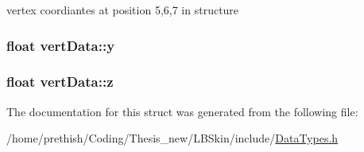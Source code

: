 vertex coordiantes at position 5,6,7 in structure 

\hypertarget{structvert_data_a236ce70a3ff07221161c89fe68ec00ae}{
\subsubsection[{y}]{\setlength{\rightskip}{0pt plus 5cm}float vert\-Data\-::y}}\label{structvert_data_a236ce70a3ff07221161c89fe68ec00ae}
\hypertarget{structvert_data_a169a9a3ba4dae44a7b9a5ea62041a3fe}{
\subsubsection[{z}]{\setlength{\rightskip}{0pt plus 5cm}float vert\-Data\-::z}}\label{structvert_data_a169a9a3ba4dae44a7b9a5ea62041a3fe}


The documentation for this struct was generated from the following file\-:\begin{DoxyCompactItemize}
\item 
/home/prethish/\-Coding/\-Thesis\-\_\-new/\-L\-B\-Skin/include/\hyperlink{_data_types_8h}{Data\-Types.\-h}\end{DoxyCompactItemize}

